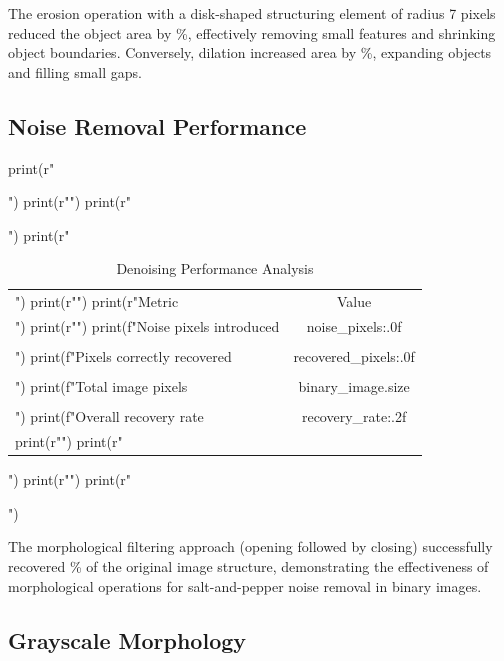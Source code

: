 \documentclass[a4paper, 11pt]{article}
\begin{document}
The erosion operation with a disk-shaped structuring element of radius 7 pixels reduced the
object area by \%, effectively removing small features
and shrinking object boundaries. Conversely, dilation increased area by
\%, expanding objects and filling small gaps.

\subsection{Noise Removal Performance}

\begin{pycode}
print(r"\begin{table}[htbp]")
print(r"\centering")
print(r"\caption{Denoising Performance Analysis}")
print(r"\begin{tabular}{lc}")
print(r"\toprule")
print(r"Metric & Value \\")
print(r"\midrule")
print(f"Noise pixels introduced & {noise_pixels:.0f} \\\\")
print(f"Pixels correctly recovered & {recovered_pixels:.0f} \\\\")
print(f"Total image pixels & {binary_image.size} \\\\")
print(f"Overall recovery rate & {recovery_rate:.2f}\\%
print(r"\bottomrule")
print(r"\end{tabular}")
print(r"\label{tab:denoise}")
print(r"\end{table}")
\end{pycode}

The morphological filtering approach (opening followed by closing) successfully recovered
\% of the original image structure, demonstrating the effectiveness
of morphological operations for salt-and-pepper noise removal in binary images.

\subsection{Grayscale Morphology}
\end{document}
